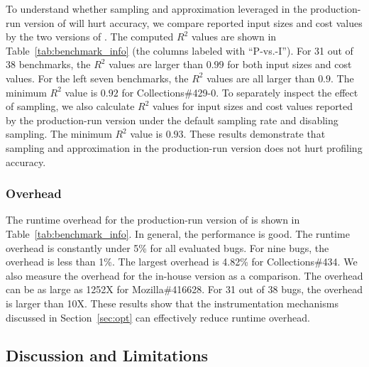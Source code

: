 
To understand whether sampling and approximation leveraged 
in the production-run version of \Tool will hurt accuracy, 
we compare reported input sizes and cost values by the two versions of \Tool.
The computed $R^2$ values are shown in Table~\ref{tab:benchmark_info} 
(the columns labeled with ``P-vs.-I''). 
For 31 out of 38 benchmarks, 
the $R^2$ values are larger than $0.99$ for both input sizes and cost values. 
For the left seven benchmarks, the $R^2$ values are all larger than $0.9$.
The minimum $R^2$ value is $0.92$ for Collections\#429-0. 
To separately inspect the effect of sampling, 
we also calculate $R^2$ values for input sizes and cost values reported 
by the production-run version under the default sampling rate and disabling sampling. 
The minimum $R^2$ value is $0.93$. 
These results demonstrate that sampling and approximation in the production-run 
version does not hurt profiling accuracy. 


\subsubsection{Overhead}
The runtime overhead for the production-run version of \Tool is 
shown in Table~\ref{tab:benchmark_info}. 
In general, the performance is good. The runtime overhead is constantly 
under 5\% for all evaluated bugs. 
For nine bugs, the overhead is less than 1\%. 
The largest overhead is 4.82\% for Collections\#434. 
We also measure the overhead for the in-house version as a comparison. 
The overhead can be as large as 1252X for Mozilla\#416628.
For 31 out of 38 bugs, the overhead is larger than 10X. 
These results show that the instrumentation mechanisms 
discussed in Section~\ref{sec:opt} can effectively reduce runtime overhead. 



\subsection{Discussion and Limitations}



